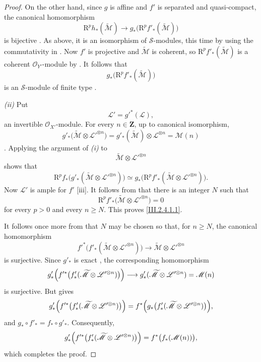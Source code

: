 \documentclass[oneside]{amsart}
\theoremstyle{ega-env-style}
\theoremstyle{ega-thm-env-style}
\theoremstyle{ega-defn-env-style}
\def\mathcal{\mathscr}
\def\sh{\mathcal}                   %
\def\bb{\mathbf}                    %
\def\geq{\geqslant}                 %
\def\RR{\mathrm{R}}                 %
\begin{document}
\begin{proof}
On the other hand, since $g$ is affine and $f'$ is separated and quasi-compact, the canonical homomorphism
\[
  \RR^p h_*(\widetilde{\sh{M}})
  \longrightarrow
  g_*\bigl(\RR^p f'_*(\widetilde{\sh{M}})\bigr)
\]
is bijective .
As above, it is an isomorphism of $\sh{S}$-modules, this time by using the commutativity in .
Now $f'$ is projective and $\widetilde{\sh{M}}$ is coherent, so $\RR^p f'_*(\widetilde{\sh{M}})$ is a coherent $\sh{O}_{Y'}$-module by .
It follows that
\[
  g_*\bigl(\RR^p f'_*(\widetilde{\sh{M}})\bigr)
\]
is an $\sh{S}$-module of finite type .

\emph{(ii)} Put
\[
  \sh{L}'=g'^*(\sh{L}),
\]
an invertible $\sh{O}_{X'}$-module.
For every $n\in\bb Z$, up to canonical isomorphism,
\[
  g'_*\bigl(\widetilde{\sh{M}}\otimes\sh{L}'^{\otimes n}\bigr)
  =
  g'_*(\widetilde{\sh{M}})\otimes\sh{L}^{\otimes n}
  =
  \sh{M}(n)
\]
.
Applying the argument of \emph{(i)} to
\[
  \widetilde{\sh{M}}\otimes\sh{L}'^{\otimes n}
\]
shows that
\[
  \RR^p f_*
  \bigl(g'_*(\widetilde{\sh{M}}\otimes\sh{L}'^{\otimes n})\bigr)
  \simeq
  g_*\bigl(\RR^p f'_*
  (\widetilde{\sh{M}}\otimes\sh{L}'^{\otimes n})\bigr).
\]
Now $\sh{L}'$ is ample for $f'$ [iii].
It follows from  that there is an integer $N$ such that
\[
  \RR^p f'_*
  \bigl(\widetilde{\sh{M}}\otimes\sh{L}'^{\otimes n}\bigr)=0
\]
for every $p>0$ and every $n\geq N$.
This proves \eqref{III.2.4.1.1}.

It follows once more from  that $N$ may be chosen so that, for $n\geq N$, the canonical homomorphism
\[
  f'^*\bigl(f'_*(\widetilde{\sh{M}}\otimes\sh{L}'^{\otimes n})\bigr)
  \longrightarrow
  \widetilde{\sh{M}}\otimes\sh{L}'^{\otimes n}
\]
is surjective.
Since $g'_*$ is exact , the corresponding homomorphism
\[
  g'_*\Bigl(
    f'^*\bigl(f'_*(\widetilde{\sh{M}}\otimes\sh{L}'^{\otimes n})\bigr)
  \Bigr)
  \longrightarrow
  g'_*(\widetilde{\sh{M}}\otimes\sh{L}'^{\otimes n})
  =\sh{M}(n)
\]
is surjective.
But  gives
\[
  g'_*\Bigl(
    f'^*\bigl(f'_*(\widetilde{\sh{M}}\otimes\sh{L}'^{\otimes n})\bigr)
  \Bigr)
  =
  f^*\Bigl(
    g_*\bigl(f'_*(\widetilde{\sh{M}}\otimes\sh{L}'^{\otimes n})\bigr)
  \Bigr),
\]
and $g_*\circ f'_*=f_*\circ g'_*$.
Consequently,
\[
  g'_*\Bigl(
    f'^*\bigl(f'_*(\widetilde{\sh{M}}\otimes\sh{L}'^{\otimes n})\bigr)
  \Bigr)
  =
  f^*\bigl(f_*(\sh{M}(n))\bigr),
\]
which completes the proof.
\end{proof}
\end{document}
